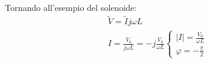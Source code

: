 \documentclass[a4paper, oneside]{article}
\begin{document}
\hfill\\
Tornando all'esempio del solenoide:
\begin{gather*}
    \tilde{V} = \tilde{I} j \omega L\\
    I = \frac{V_0}{j \omega L} = - j\frac{V_0}{\omega L} \begin{cases}
        |I| = \frac{V_0}{\omega L}\\
        \varphi = -\frac{\pi}{2}
    \end{cases}
\end{gather*}
\end{document}
